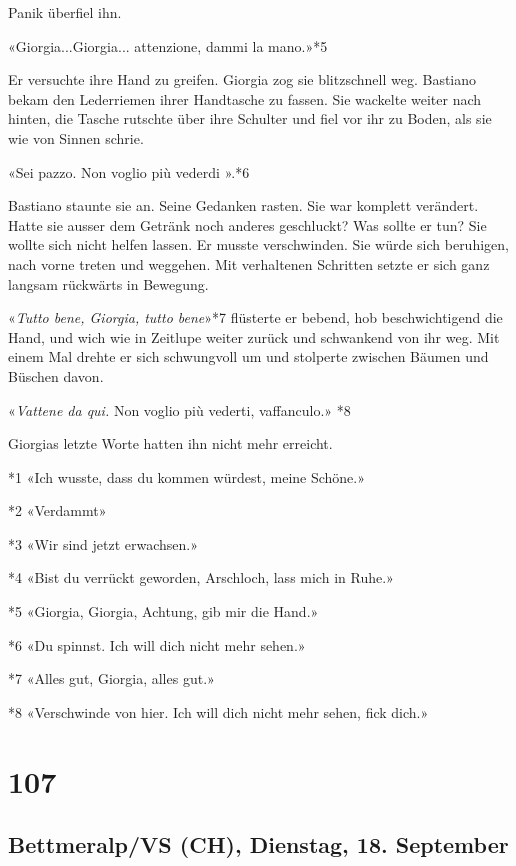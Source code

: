 Panik überfiel ihn.

«Giorgia...Giorgia... attenzione, dammi la mano.»*5

Er versuchte ihre Hand zu greifen. Giorgia zog sie blitzschnell weg.
Bastiano bekam den Lederriemen ihrer Handtasche zu fassen. Sie wackelte
weiter nach hinten, die Tasche rutschte über ihre Schulter und fiel vor
ihr zu Boden, als sie wie von Sinnen schrie.

«Sei pazzo. Non voglio più vederdi ».*6

Bastiano staunte sie an. Seine Gedanken rasten. Sie war komplett
verändert. Hatte sie ausser dem Getränk noch anderes geschluckt? Was
sollte er tun? Sie wollte sich nicht helfen lassen. Er musste
verschwinden. Sie würde sich beruhigen, nach vorne treten und weggehen.
Mit verhaltenen Schritten setzte er sich ganz langsam rückwärts in
Bewegung.

«\emph{Tutto bene, Giorgia, tutto bene}»*7 flüsterte er bebend, hob
beschwichtigend die Hand, und wich wie in Zeitlupe weiter zurück und
schwankend von ihr weg. Mit einem Mal drehte er sich schwungvoll um und
stolperte zwischen Bäumen und Büschen davon.

«\emph{Vattene da qui.} Non voglio più vederti, vaffanculo.» *8

Giorgias letzte Worte hatten ihn nicht mehr erreicht.

*1 «Ich wusste, dass du kommen würdest, meine Schöne.»

*2 «Verdammt»

*3 «Wir sind jetzt erwachsen.»

*4 «Bist du verrückt geworden, Arschloch, lass mich in Ruhe.»

*5 «Giorgia, Giorgia, Achtung, gib mir die Hand.»

*6 «Du spinnst. Ich will dich nicht mehr sehen.»

*7 «Alles gut, Giorgia, alles gut.»

*8 «Verschwinde von hier. Ich will dich nicht mehr sehen, fick dich.»

\chapter{107}\label{section-107}

\section{Bettmeralp/VS (CH), Dienstag, 18.
September}\label{bettmeralpvs-ch-dienstag-18.-september}

